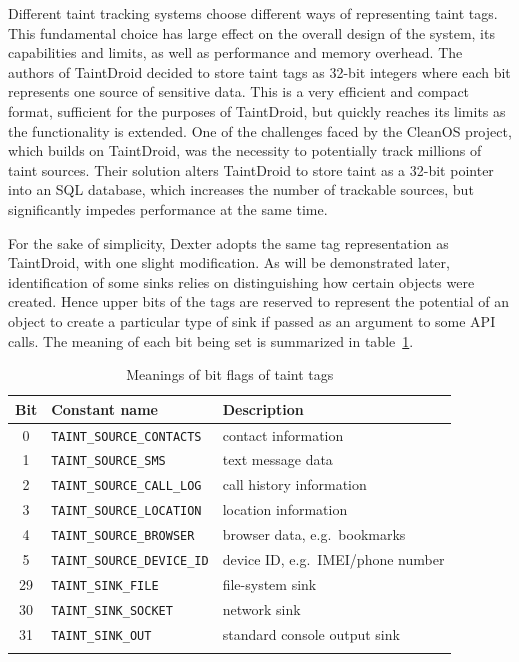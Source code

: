 \documentclass[12pt,twoside,notitlepage]{report}
\begin{document}
Different taint tracking systems choose different ways of representing taint tags. This fundamental choice has large effect on the overall design of the system, its capabilities and limits, as well as performance and memory overhead. The authors of TaintDroid decided to store taint tags as 32-bit integers where each bit represents one source of sensitive data. This is a very efficient and compact format, sufficient for the purposes of TaintDroid, but quickly reaches its limits as the functionality is extended. One of the challenges faced by the CleanOS project, which builds on TaintDroid, was the necessity to potentially track millions of taint sources. Their solution alters TaintDroid to store taint as a 32-bit pointer into an SQL database, which increases the number of trackable sources, but significantly impedes performance at the same time. 

For the sake of simplicity, Dexter adopts the same tag representation as TaintDroid, with one slight modification. As will be demonstrated later, identification of some sinks relies on distinguishing how certain objects were created. Hence upper bits of the tags are reserved to represent the potential of an object to create a particular type of sink if passed as an argument to some API calls. The meaning of each bit being set is summarized in table~\ref{table:TaintTagStorage_BitMeaning}.

\begin{table}
	\begin{center}
	\begin{tabular}{|c|l|l|}
		\firsthline
		\textbf{Bit} & \textbf{Constant name}        & \textbf{Description} \\
		\hline
		0            & \verb$TAINT_SOURCE_CONTACTS$  & contact information \\
		1            & \verb$TAINT_SOURCE_SMS$       & text message data \\
		2            & \verb$TAINT_SOURCE_CALL_LOG$  & call history information \\
		3            & \verb$TAINT_SOURCE_LOCATION$  & location information \\
		4            & \verb$TAINT_SOURCE_BROWSER$   & browser data, e.g.\ bookmarks \\
		5            & \verb$TAINT_SOURCE_DEVICE_ID$ & device ID, e.g.\ IMEI/phone number \\
		\hline
		29           & \verb$TAINT_SINK_FILE$        & file-system sink \\
		30           & \verb$TAINT_SINK_SOCKET$      & network sink \\
		31           & \verb$TAINT_SINK_OUT$         & standard console output sink \\
		\lasthline
	\end{tabular}
	\end{center}
	\caption{Meanings of bit flags of taint tags}
	\label{table:TaintTagStorage_BitMeaning}
\end{table}
\end{document}
